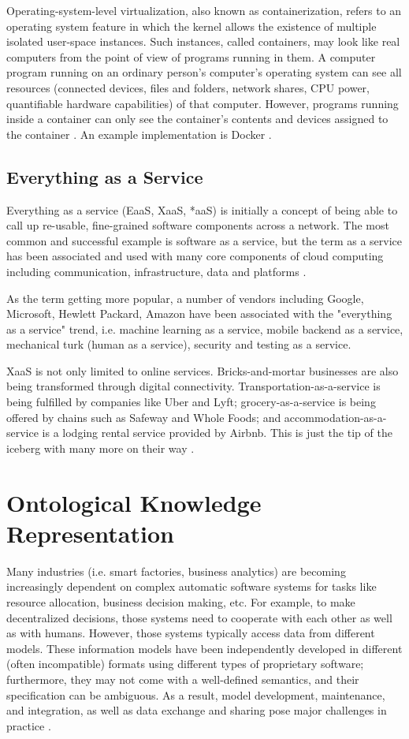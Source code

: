 Operating-system-level virtualization, also known as containerization, refers to an operating system feature in which the kernel allows the existence of multiple isolated user-space instances. Such instances, called containers, may look like real computers from the point of view of programs running in them. 
A computer program running on an ordinary person's computer's operating system can see all resources (connected devices, files and folders, network shares, CPU power, quantifiable hardware capabilities) of that computer. However, programs running inside a container can only see the container's contents and devices assigned to the container \cite{containerization}.
An example implementation is Docker \cite{docker}.

\subsection{Everything as a Service}
Everything as a service (EaaS, XaaS, *aaS) is initially a concept of being able to call up re-usable, fine-grained software components across a network. The most common and successful example is software as a service, but the term as a service has been associated and used with many core components of cloud computing including communication, infrastructure, data and platforms \cite{XaaS}.

As the term getting more popular, a number of vendors including Google, Microsoft, Hewlett Packard, Amazon have been associated with the "everything as a service" trend, i.e. machine learning as a service, mobile backend as a service, mechanical turk (human as a service), security and testing as a service.

XaaS is not only limited to online services. Bricks-and-mortar businesses are also being transformed through digital connectivity. Transportation-as-a-service is being fulfilled by companies like Uber and Lyft; grocery-as-a-service is being offered by chains such as Safeway and Whole Foods; and accommodation-as-a-service is a lodging rental service provided by Airbnb. This is just the tip of the iceberg with many more on their way \cite{XaaS_beyond}.

\section{Ontological Knowledge Representation}
Many industries (i.e. smart factories, business analytics) are
becoming increasingly dependent on complex automatic software systems for tasks like resource allocation, business decision making, etc.
For example, to make decentralized decisions, those systems need to cooperate with each other as well as with humans.
However, those systems typically access data from different models.
These information models have been independently developed in different (often incompatible) formats using different types of proprietary software; furthermore, they may not come with a well-defined semantics, and their specification can be ambiguous.
As a result, model development, maintenance, and integration, as well as data exchange and sharing pose major challenges in practice
\cite{CapturingIndustrialInformationWithOntologies}.

